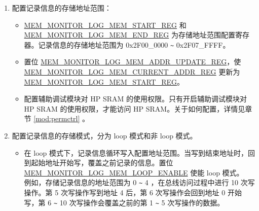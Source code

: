 \documentclass[main\_\_CN.tex]{subfiles}
\begin{document}
\begin{enumerate}
\begin{itemize}
            \item 在 byte 监测模式下，\hyperref[regdesc:MEMMONITORLOGCHECKDATAREG]{MEM\_MONITOR\_LOG\_CHECK\_DATA\_REG}[7:0] 为监测的特定 byte。
            \item \hyperref[regdesc:MEMMONITORLOGDATAMASKREG]{MEM\_MONITOR\_LOG\_DATA\_MASK\_REG} 用于屏蔽 \hyperref[regdesc:MEMMONITORLOGCHECKDATAREG]{MEM\_MONITOR\_LOG\_CHECK\_DATA\_REG} 的相应 byte。当某一 byte 被屏蔽，表示该 byte 可为任意值。例如，在 word 监测模式下，若 \hyperref[regdesc:MEMMONITORLOGCHECKDATAREG]{MEM\_MONITOR\_LOG\_CHECK\_DATA\_REG} 配置为 0x01020304，\hyperref[regdesc:MEMMONITORLOGDATAMASKREG]{MEM\_MONITOR\_LOG\_DATA\_MASK\_REG} 配置为 0x1，此时只要总线写 0x010203XX，都会被记录。
        \end{itemize}
    \item 配置记录信息的存储地址范围：
        \begin{itemize}
            \item \hyperref[regdesc:MEMMONITORLOGMEMSTARTREG]{MEM\_MONITOR\_LOG\_MEM\_START\_REG} 和 \hyperref[regdesc:MEMMONITORLOGMEMENDREG]{MEM\_MONITOR\_LOG\_MEM\_END\_REG} 为存储地址范围配置寄存器。记录信息的存储地址范围为 0x2F00\_0000 \verb+~+ 0x2F07\_FFFF。
            \item 置位 \hyperref[regdesc:MEMMONITORLOGMEMADDRUPDATEREG]{MEM\_MONITOR\_LOG\_MEM\_ADDR\_UPDATE\_REG}，使 \hyperref[regdesc:MEMMONITORLOGMEMCURRENTADDRREG]{MEM\_MONITOR\_LOG\_MEM\_CURRENT\_ADDR\_REG} 更新为 \hyperref[regdesc:MEMMONITORLOGMEMSTARTREG]{MEM\_MONITOR\_LOG\_MEM\_START\_REG}。
            \item 配置辅助调试模块对 HP SRAM 的使用权限。只有开启辅助调试模块对 HP SRAM 的使用权限，才能访问 HP SRAM。关于如何配置，详情见章节 \ref{mod:permctrl} \textit{}。
        \end{itemize}
    \item \label{other:dbgassist-item-log-config-step5} 配置记录信息的存储模式，分为 loop 模式和非 loop 模式。
        \begin{itemize}
            \item 在 loop 模式下，记录信息循环写入配置地址范围。当写到结束地址时，回到起始地址开始写，覆盖之前记录的信息。置位 \hyperref[fielddesc:MEMMONITORLOGMEMLOOPENABLE]{MEM\_MONITOR\_LOG\_MEM\_LOOP\_ENABLE} 使能 loop 模式。\\
            例如，存储记录信息的地址范围为 0 \verb+~+ 4 ，在总线访问过程中进行 10 次写操作。第 5 次写操作写到地址 4 后，第 6 次写操作会回到地址 0 开始写，第 6 \verb+~+ 10 次写操作会覆盖之前的第 1 \verb+~+ 5 次写操作的数据。

\end{itemize}
\end{enumerate}
\end{document}

